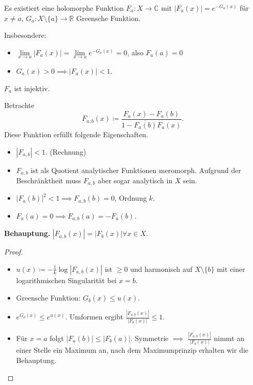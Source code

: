 \documentclass{beamer}
\newcommand{\R}{\mathbb{R}}
\newcommand{\C}{\mathbb{C}}
\begin{document}
    \begin{frame}
        \begin{lemma}
            Es existiert eine holomorphe Funktion $F_a\colon X \to \C$ mit $|F_a(x)| = e^{-G_a(x)}$ für $x \neq a$, $G_a\colon X \setminus \{a\} \to \R$ Greensche Funktion.
        \end{lemma}
        Insbesondere:
        \begin{itemize}
            \item $\lim\limits_{x \to a} |F_a(x)| = \lim\limits_{x \to a} e^{-G_a(x)} = 0$, also $F_a(a) = 0$
            \item $G_a(x) > 0 \implies |F_a(x)| < 1$.
        \end{itemize}
    \end{frame}
    
    \begin{frame}
        \begin{lemma}
            $F_a$ ist injektiv.
        \end{lemma}
        Betrachte $$F_{a,b}(x) \coloneqq \frac{F_a(x) - F_a(b)}{1 - \overline{F_a(b)}F_a(x)}.$$ Diese Funktion erfüllt folgende Eigenschaften.
        \begin{itemize}
            \item $|F_{a,b}| < 1$. (Rechnung)
            \item $F_{a,b}$ ist als Quotient analytischer Funktionen meromorph. Aufgrund der Beschränktheit muss $F_{a,b}$ aber sogar analytisch in $X$ sein.
            \item $|F_a(b)|^2 < 1 \implies F_{a,b}(b) = 0$, Ordnung $k$.
            \item $F_a(a) = 0 \implies F_{a,b}(a) = -F_a(b)$.
        \end{itemize}
    \end{frame}
    \begin{frame}
        \textbf{Behauptung.} $|F_{a,b}(x)| = |F_b(x)| \forall x\in X$.
        \begin{proof}
            \begin{itemize}
                \item $u(x) \coloneqq - \frac{1}{k} \log|F_{a,b}(x)|$ ist $\geq 0$ und harmonisch auf $X \setminus \{b\}$ mit einer logarithmischen Singularität bei $x = b$.
                \item Greensche Funktion: $G_b(x) \leq u(x)$.
                \item $e^{G_b(x)} \leq e^{u(x)}$. Umformen ergibt $\frac{|F_{a,b}(x)|}{|F_b(x)|} \leq 1$.
                \item Für $x = a$ folgt $|F_a(b)| \leq |F_b(a)|$. Symmetrie $\implies$ $\frac{|F_{a,b}(x)|}{|F_b(x)|}$ nimmt an einer Stelle ein Maximum an, nach dem Maximumprinzip erhalten wir die Behauptung.
            \end{itemize}
        \end{proof}
    \end{frame}
\end{document}
